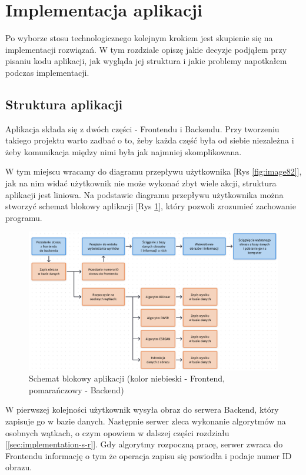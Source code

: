 \section{Implementacja aplikacji}

Po wyborze stosu technologicznego kolejnym krokiem jest skupienie się na implementacji rozwiązań. W tym rozdziale opiszę jakie decyzje podjąłem przy pisaniu kodu aplikacji, jak wygląda jej struktura i jakie problemy napotkałem podczas implementacji.

\subsection*{Struktura aplikacji}

Aplikacja składa się z dwóch części - Frontendu i Backendu. Przy tworzeniu takiego projektu warto zadbać o to, żeby każda część była od siebie niezależna i żeby komunikacja między nimi była jak najmniej skomplikowana.

W tym miejscu wracamy do diagramu przepływu użytkownika [Rys \ref{fig:image82}], jak na nim widać użytkownik nie może wykonać zbyt wiele akcji, struktura aplikacji jest liniowa. Na podstawie diagramu przepływu użytkownika można stworzyć schemat blokowy aplikacji [Rys \ref{fig:image87}], który pozwoli zrozumieć zachowanie programu.

\begin{figure}[H]
    \centering
    \includegraphics[width=\linewidth]{Rozdziały/06.Aplikacja/Obrazy/mechanizm_aplikacji.png}  
    \caption{Schemat blokowy aplikacji (kolor niebieski - Frontend, pomarańczowy - Backend)}
    \label{fig:image87}
\end{figure}

W pierwszej kolejności użytkownik wysyła obraz do serwera Backend, który zapisuje go w bazie danych. Następnie serwer zleca wykonanie algorytmów na osobnych wątkach, o czym opowiem w dalszej części rozdziału [\ref{sec:implementation-s-r}]. Gdy algorytmy rozpoczną pracę, serwer zwraca do Frontendu informację o tym że operacja zapisu się powiodła i podaje numer ID obrazu. 

